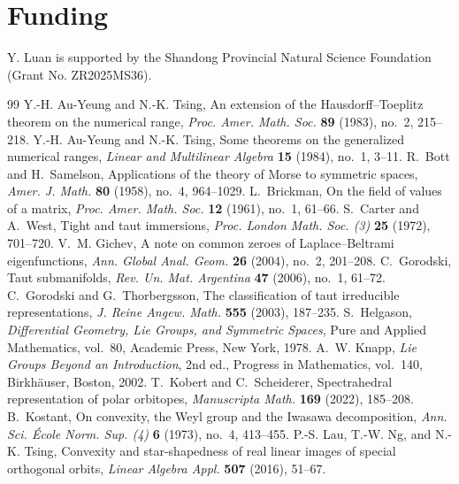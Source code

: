 \documentclass[11pt,reqno]{amsart}
\theoremstyle{remark}
\begin{document}
\section*{Funding}
Y. Luan is supported by the Shandong Provincial Natural Science Foundation (Grant No. ZR2025MS36).



\begin{thebibliography}{99}
Y.-H. Au-Yeung and N.-K. Tsing, An extension of the
Hausdorff--Toeplitz theorem on the numerical range,
\emph{Proc. Amer. Math. Soc.} \textbf{89} (1983), no.~2, 215--218.
Y.-H. Au-Yeung and N.-K. Tsing, Some theorems on the generalized
numerical ranges, \emph{Linear and Multilinear Algebra} \textbf{15}
(1984), no.~1, 3--11.
R.~Bott and H.~Samelson, Applications of the theory of Morse to symmetric
spaces, \emph{Amer. J. Math.} \textbf{80} (1958), no.~4, 964--1029.
L.~Brickman, On the field of values of a matrix,
\emph{Proc. Amer. Math. Soc.} \textbf{12} (1961), no.~1, 61--66.
S.~Carter and A.~West, Tight and taut immersions, \emph{Proc. London
Math. Soc. (3)} \textbf{25} (1972), 701--720.
V.~M. Gichev, A note on common zeroes of Laplace--Beltrami
eigenfunctions, \emph{Ann. Global Anal. Geom.} \textbf{26} (2004),
no.~2, 201--208.
C.~Gorodski, Taut submanifolds, \emph{Rev. Un. Mat. Argentina}
\textbf{47} (2006), no.~1, 61--72.
C.~Gorodski and G.~Thorbergsson, The classification of taut
irreducible representations, \emph{J. Reine Angew. Math.}
\textbf{555} (2003), 187--235.
S.~Helgason, \emph{Differential Geometry, Lie Groups, and Symmetric
Spaces}, Pure and Applied Mathematics, vol.~80, Academic Press,
New York, 1978.
A.~W. Knapp, \emph{Lie Groups Beyond an Introduction}, 2nd ed.,
Progress in Mathematics, vol.~140, Birkh\"auser, Boston, 2002.
T.~Kobert and C.~Scheiderer, Spectrahedral representation of polar orbitopes,
\emph{Manuscripta Math.} \textbf{169} (2022), 185--208.
B.~Kostant, On convexity, the Weyl group and the Iwasawa decomposition,
\emph{Ann. Sci. \'Ecole Norm. Sup. (4)} \textbf{6} (1973), no.~4,
413--455.
P.-S. Lau, T.-W. Ng, and N.-K. Tsing, Convexity and star-shapedness
of real linear images of special orthogonal orbits,
\emph{Linear Algebra Appl.} \textbf{507} (2016), 51--67.

\end{thebibliography}
\end{document}
